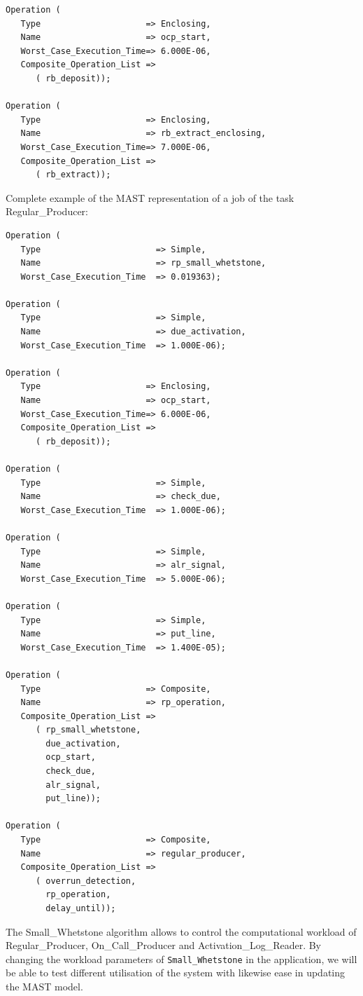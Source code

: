 \documentclass{article}
\begin{document}
\begin{lstlisting}
Operation (
   Type                     => Enclosing,
   Name                     => ocp_start,
   Worst_Case_Execution_Time=> 6.000E-06,
   Composite_Operation_List =>
      ( rb_deposit));

Operation (
   Type                     => Enclosing,
   Name                     => rb_extract_enclosing,
   Worst_Case_Execution_Time=> 7.000E-06,
   Composite_Operation_List =>
      ( rb_extract));
\end{lstlisting}

Complete example of the MAST representation of a job of the task Regular\_Producer:

\begin{lstlisting}
Operation (
   Type                       => Simple,
   Name                       => rp_small_whetstone,
   Worst_Case_Execution_Time  => 0.019363);

Operation (
   Type                       => Simple,
   Name                       => due_activation,
   Worst_Case_Execution_Time  => 1.000E-06);

Operation (
   Type                     => Enclosing,
   Name                     => ocp_start,
   Worst_Case_Execution_Time=> 6.000E-06,
   Composite_Operation_List =>
      ( rb_deposit));

Operation (
   Type                       => Simple,
   Name                       => check_due,
   Worst_Case_Execution_Time  => 1.000E-06);

Operation (
   Type                       => Simple,
   Name                       => alr_signal,
   Worst_Case_Execution_Time  => 5.000E-06);

Operation (
   Type                       => Simple,
   Name                       => put_line,
   Worst_Case_Execution_Time  => 1.400E-05);

Operation (
   Type                     => Composite,
   Name                     => rp_operation,
   Composite_Operation_List =>
      ( rp_small_whetstone,
        due_activation,
        ocp_start,
        check_due,
        alr_signal,
        put_line));

Operation (
   Type                     => Composite,
   Name                     => regular_producer,
   Composite_Operation_List =>
      ( overrun_detection,
        rp_operation,
        delay_until));
\end{lstlisting}

The Small\_Whetstone algorithm allows to control the computational workload of Regular\_Producer, On\_Call\_Producer and Activation\_Log\_Reader. By changing the workload parameters of \texttt{Small\_Whetstone} in the application, we will be able to test different utilisation of the system with likewise ease in updating the MAST model.
\end{document}
